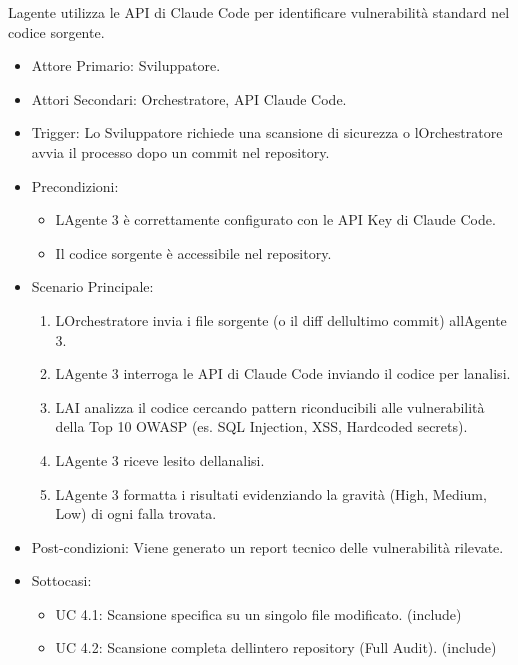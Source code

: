 \documentclass[12pt, a4paper]{article}
\begin{document}
L\textquotesingle agente utilizza le API di Claude Code per identificare
vulnerabilità standard nel codice sorgente.

\begin{itemize}
\item
  Attore Primario: Sviluppatore.
\item
  Attori Secondari: Orchestratore, API Claude Code.
\item
  Trigger: Lo Sviluppatore richiede una scansione di sicurezza o
  l\textquotesingle Orchestratore avvia il processo dopo un commit nel
  repository.
\item
  Precondizioni:

  \begin{itemize}
  \item
    L\textquotesingle Agente 3 è correttamente configurato con le API
    Key di Claude Code.
  \item
    Il codice sorgente è accessibile nel repository.
  \end{itemize}
\item
  Scenario Principale:

  \begin{enumerate}
  \item
    L\textquotesingle Orchestratore invia i file sorgente (o il diff
    dell\textquotesingle ultimo commit) all\textquotesingle Agente 3.
  \item
    L\textquotesingle Agente 3 interroga le API di Claude Code inviando
    il codice per l\textquotesingle analisi.
  \item
    L\textquotesingle AI analizza il codice cercando pattern
    riconducibili alle vulnerabilità della Top 10 OWASP (es. SQL
    Injection, XSS, Hardcoded secrets).
  \item
    L\textquotesingle Agente 3 riceve l\textquotesingle esito
    dell\textquotesingle analisi.
  \item
    L\textquotesingle Agente 3 formatta i risultati evidenziando la
    gravità (High, Medium, Low) di ogni falla trovata.
  \end{enumerate}
\item
  Post-condizioni: Viene generato un report tecnico delle vulnerabilità
  rilevate.
\item
  Sottocasi:

  \begin{itemize}
  \item
    UC 4.1: Scansione specifica su un singolo file modificato. (include)
  \item
    UC 4.2: Scansione completa dell\textquotesingle intero repository
    (Full Audit). (include)
  \end{itemize}
\end{itemize}
\end{document}
